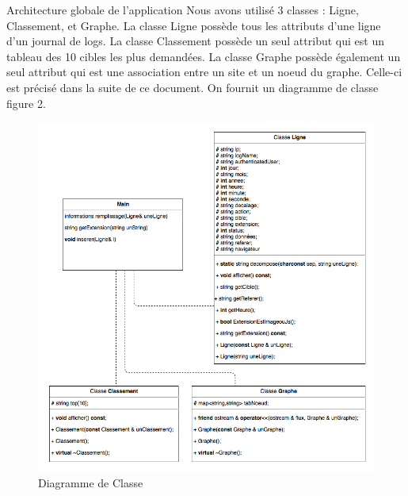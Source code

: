 \documentclass[11pt]{article}
\begin{document}
\begin{section}{Architecture globale de l'application}
Nous avons utilisé 3 classes : Ligne, Classement, et Graphe. La classe Ligne possède tous les attributs d'une ligne d'un journal de logs. La classe Classement possède un seul attribut qui est un tableau des 10 cibles les plus demandées. La classe Graphe possède également un seul attribut qui est une association entre un site et un noeud du graphe. Celle-ci est précisé dans la suite de ce document. On fournit un diagramme de classe figure 2.

\begin{figure}
\begin{center}
\includegraphics[scale=0.6]{diag.png} 
\end{center}
\caption{Diagramme de Classe}
\label{Diagramme de Classe}
\end{figure}
\end{section}
\end{document}
